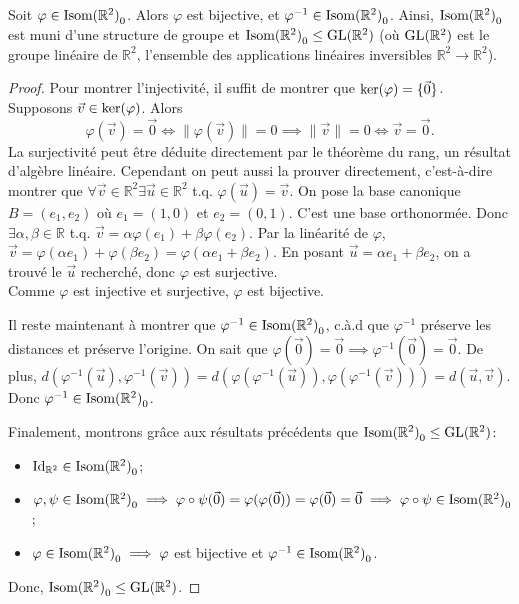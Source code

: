 \documentclass{book}
\numberwithin{equation}{section}
\renewcommand{\phi}{\varphi}
\providecommand{\plan}{{\mathbb R^2}}
\providecommand{\origin}{{\vec 0}}
\providecommand{\id}{{\textnormal{Id}}}
\providecommand{\IdR}{{\id_\plan}}
\providecommand{\isom}{{\textnormal{Isom}(\plan)}}
\providecommand{\isomo}{{\isom_0}}
\providecommand{\ker}{{\textnormal{ker}}}
\providecommand{\longueur}[1]{{\lVert#1\rVert}}
\providecommand{\subgroupeq}{\leq}
\begin{document}
\begin{thm}
	Soit $\phi \in \isomo$. Alors $\phi$ est bijective, et $\phi^{-1} \in \isomo$. Ainsi, $\isomo$ est muni d'une structure de groupe et $\isomo \subgroupeq \textnormal{GL}(\plan)$ (où $\textnormal{GL}(\plan)$ est le groupe linéaire de $\plan$, l'ensemble des applications linéaires inversibles $\plan \to \plan$).
\end{thm}
\begin{proof}
	Pour montrer l'injectivité, il suffit de montrer que $\ker(\phi) = \{\origin\}$. Supposons $\vec v \in \ker(\phi)$. Alors
	\begin{equation*}
		\phi(\vec v) = \origin \iff \longueur{\phi(\vec v)} = 0 \implies \longueur{\vec v} = 0 \iff \vec v = \origin.
	\end{equation*}
	La surjectivité peut être déduite directement par le théorème du rang, un résultat d'algèbre linéaire. Cependant on peut aussi la prouver directement, c'est-à-dire montrer que $\forall \vec v \in \plan \exists \vec u \in \plan$ t.q. $\phi(\vec u) = \vec v$. On pose la base canonique $B = (e_1, e_2)$ où $e_1 = (1, 0)$ et $e_2 = (0, 1)$. C'est une base orthonormée. Donc $\exists \alpha, \beta \in \mathbb R$ t.q. $\vec v = \alpha \phi(e_1) + \beta \phi(e_2)$. Par la linéarité de $\phi$, $\vec v = \phi(\alpha e_1) + \phi(\beta e_2) = \phi(\alpha e_1 + \beta e_2)$. En posant $\vec u = \alpha e_1 + \beta e_2$, on a trouvé le $\vec u$ recherché, donc $\phi$ est surjective.\\
	Comme $\phi$ est injective et surjective, $\phi$ est bijective.\par
	Il reste maintenant à montrer que $\phi^{-1} \in \isomo$, c.à.d que $\phi^{-1}$ préserve les distances et préserve l'origine. On sait que $\phi(\origin) = \origin \implies \phi^{-1}(\origin) = \origin$. De plus, $d(\phi^{-1}(\vec u), \phi^{-1}(\vec v)) = d(\phi(\phi^{-1}(\vec u)), \phi(\phi^{-1}(\vec v))) = d(\vec u, \vec v)$. Donc $\phi^{-1} \in \isomo$.\par
	Finalement, montrons grâce aux résultats précédents que $\isomo \subgroupeq \textnormal{GL}(\plan)$:
	\begin{itemize}
		\item $\IdR \in \isomo$;
		\item $\phi, \psi \in \isomo \implies \phi \circ \psi(\origin) = \phi(\phi(\origin)) = \phi(\origin) = \origin \implies \phi \circ \psi \in \isomo$;
		\item $\phi \in \isomo \implies \phi$ est bijective et $\phi^{-1} \in \isomo$.
	\end{itemize}
	Donc, $\isomo \subgroupeq \textnormal{GL}(\plan)$.
\end{proof}
\end{document}
